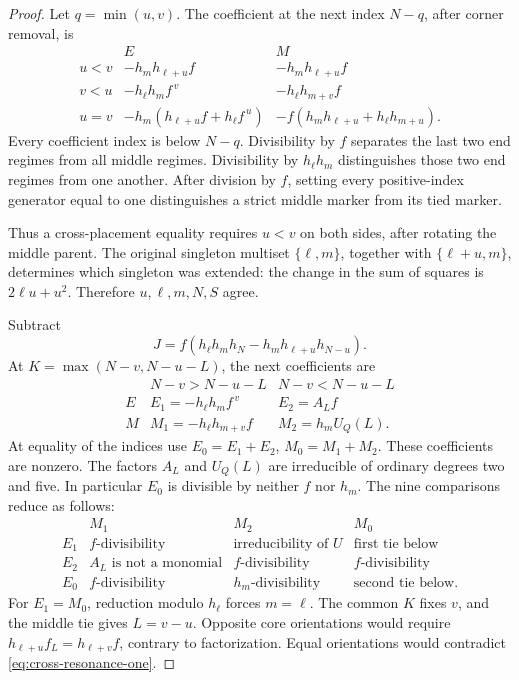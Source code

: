 \documentclass[11pt,a4paper]{amsart}
\numberwithin{equation}{section}
\theoremstyle{plain}
\theoremstyle{definition}
\begin{document}
\begin{proof}
Let \(q=\min(u,v)\).  The coefficient at the next index \(N-q\), after corner removal, is
\begin{equation}\label{eq:first-marker-table}
 \begin{array}{c|c|c}
 &E&M\\ \hline
 u<v&-h_mh_{\ell+u}f&-h_mh_{\ell+u}f\\
 v<u&-h_\ell h_m f^{\,v}&-h_\ell h_{m+v}f\\
 u=v&-h_m(h_{\ell+u}f+h_\ell f^{\,u})
     &-f(h_mh_{\ell+u}+h_\ell h_{m+u}).
 \end{array}
\end{equation}
Every coefficient index is below \(N-q\).  Divisibility by \(f\) separates the last two end regimes from all middle regimes.  Divisibility by \(h_\ell h_m\) distinguishes those two end regimes from one another.  After division by \(f\), setting every positive-index generator equal to one distinguishes a strict middle marker from its tied marker.

Thus a cross-placement equality requires \(u<v\) on both sides, after rotating the middle parent.  The original singleton multiset \(\{\ell,m\}\), together with \(\{\ell+u,m\}\), determines which singleton was extended: the change in the sum of squares is \(2\ell u+u^2\).  Therefore \(u,\ell,m,N,S\) agree.

Subtract
\[
 J=f(h_\ell h_mh_N-h_mh_{\ell+u}h_{N-u}).
\]
At \(K=\max(N-v,N-u-L)\), the next coefficients are
\begin{equation}\label{eq:third-marker-table}
 \begin{array}{c|c|c}
 &N-v>N-u-L&N-v<N-u-L\\ \hline
 E&E_1=-h_\ell h_m f^{\,v}&E_2=A_Lf\\
 M&M_1=-h_\ell h_{m+v}f&M_2=h_mU_Q(L).
 \end{array}
\end{equation}
At equality of the indices use \(E_0=E_1+E_2\), \(M_0=M_1+M_2\).  These coefficients are nonzero.  The factors \(A_L\) and \(U_Q(L)\) are irreducible of ordinary degrees two and five.  In particular \(E_0\) is divisible by neither \(f\) nor \(h_m\).  The nine comparisons reduce as follows:
\begin{equation}\label{eq:cross-marker-exclusions}
 \begin{array}{c|ccc}
 &M_1&M_2&M_0\\ \hline
 E_1&f\text{-divisibility}&\text{irreducibility of }U&\text{first tie below}\\
 E_2&A_L\text{ is not a monomial}&f\text{-divisibility}&f\text{-divisibility}\\
 E_0&f\text{-divisibility}&h_m\text{-divisibility}&\text{second tie below}.
 \end{array}
\end{equation}
For \(E_1=M_0\), reduction modulo \(h_\ell\) forces \(m=\ell\).  The common \(K\) fixes \(v\), and the middle tie gives \(L=v-u\).  Opposite core orientations would require
\(h_{\ell+u}f_L=h_{\ell+v}f\), contrary to factorization.  Equal orientations would contradict \eqref{eq:cross-resonance-one}.


\end{proof}
\end{document}

